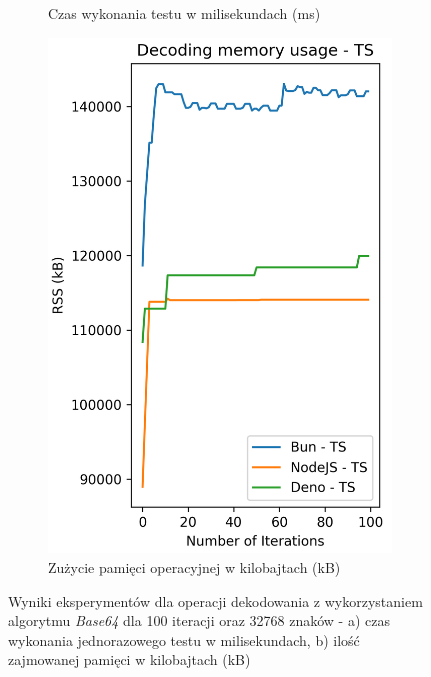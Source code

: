 \begin{figure}[H]
\begin{subfigure}[b]{0.44\textwidth}
    \caption{Czas wykonania testu w milisekundach (ms)}
    \label{fig:decoding_e1_ts_time}
  \end{subfigure}
  \begin{subfigure}[b]{0.44\textwidth}
    \centering
    \includegraphics[width=\textwidth]{Figures/coding/base64_100_decoding_ts_memory.png}
    \caption{Zużycie pamięci operacyjnej w kilobajtach (kB)}
    \label{fig:decoding_e1_ts_memory}
  \end{subfigure}
  \hfill
  \caption{Wyniki eksperymentów dla operacji dekodowania z wykorzystaniem algorytmu \textit{Base64} dla 100 iteracji oraz 32768 znaków - a) czas wykonania jednorazowego testu w milisekundach, b) ilość zajmowanej pamięci w kilobajtach (kB)}
  \label{fig:decoding_e1_ts}
\end{figure}


